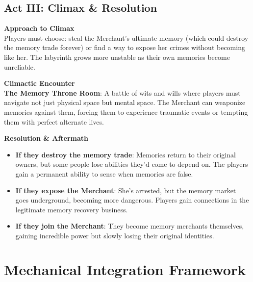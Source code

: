 \documentclass[11pt]{article}
\begin{document}
\subsection*{Act III: Climax \& Resolution}

\textbf{Approach to Climax} \\
Players must choose: steal the Merchant's ultimate memory (which could destroy the memory trade forever) or find a way to expose her crimes without becoming like her. The labyrinth grows more unstable as their own memories become unreliable.

\textbf{Climactic Encounter} \\
\textbf{The Memory Throne Room}: A battle of wits and wills where players must navigate not just physical space but mental space. The Merchant can weaponize memories against them, forcing them to experience traumatic events or tempting them with perfect alternate lives.

\textbf{Resolution \& Aftermath}
\begin{itemize}[leftmargin=*]
  \item \textbf{If they destroy the memory trade}: Memories return to their original owners, but some people lose abilities they'd come to depend on. The players gain a permanent ability to sense when memories are false.
  \item \textbf{If they expose the Merchant}: She's arrested, but the memory market goes underground, becoming more dangerous. Players gain connections in the legitimate memory recovery business.
  \item \textbf{If they join the Merchant}: They become memory merchants themselves, gaining incredible power but slowly losing their original identities.
\end{itemize}

\section*{Mechanical Integration Framework}
\end{document}
